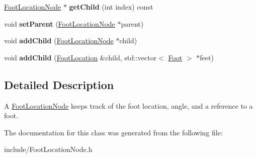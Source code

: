 \begin{DoxyCompactItemize}
\item 
\hypertarget{classfsp_1_1_foot_location_node_a36f4a5698ec93d337822203dbdc57c4d}{\hyperlink{classfsp_1_1_foot_location_node}{Foot\-Location\-Node} $\ast$ {\bfseries get\-Child} (int index) const }\label{classfsp_1_1_foot_location_node_a36f4a5698ec93d337822203dbdc57c4d}

\item 
\hypertarget{classfsp_1_1_foot_location_node_a4f8d6a8830f275930eae2d7d8e5f1c23}{void {\bfseries set\-Parent} (\hyperlink{classfsp_1_1_foot_location_node}{Foot\-Location\-Node} $\ast$parent)}\label{classfsp_1_1_foot_location_node_a4f8d6a8830f275930eae2d7d8e5f1c23}

\item 
\hypertarget{classfsp_1_1_foot_location_node_a4c704c931bca16f0cf68a583c09ac537}{void {\bfseries add\-Child} (\hyperlink{classfsp_1_1_foot_location_node}{Foot\-Location\-Node} $\ast$child)}\label{classfsp_1_1_foot_location_node_a4c704c931bca16f0cf68a583c09ac537}

\item 
\hypertarget{classfsp_1_1_foot_location_node_ab0692a689577fd3442c3245e16db8bc7}{void {\bfseries add\-Child} (\hyperlink{classfsp_1_1_foot_location}{Foot\-Location} \&child, std\-::vector$<$ \hyperlink{classfsp_1_1_foot}{Foot} $>$ $\ast$feet)}\label{classfsp_1_1_foot_location_node_ab0692a689577fd3442c3245e16db8bc7}

\end{DoxyCompactItemize}


\subsection{Detailed Description}
A \hyperlink{classfsp_1_1_foot_location_node}{Foot\-Location\-Node} keeps track of the foot location, angle, and a reference to a foot. 

The documentation for this class was generated from the following file\-:\begin{DoxyCompactItemize}
\item 
include/Foot\-Location\-Node.\-h\end{DoxyCompactItemize}
